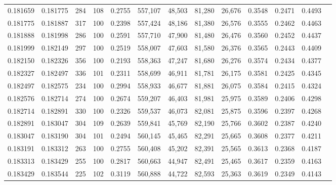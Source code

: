 \begin{tabular}{rrrrrrrrrrrrr}
0.181659 & 0.181775 &   284 & 108 &                                     0.2755 & 557,107 &  48,503 &  81,280 &  26,676 & 0.3548 & 0.2471 & 0.4493 \\
0.181775 & 0.181887 &   317 & 100 &                                     0.2398 & 557,424 &  48,186 &  81,380 &  26,576 & 0.3555 & 0.2462 & 0.4463 \\
0.181888 & 0.181998 &   286 & 100 &                                     0.2591 & 557,710 &  47,900 &  81,480 &  26,476 & 0.3560 & 0.2452 & 0.4437 \\
0.181999 & 0.182149 &   297 & 100 &                                     0.2519 & 558,007 &  47,603 &  81,580 &  26,376 & 0.3565 & 0.2443 & 0.4409 \\
0.182150 & 0.182326 &   356 & 100 &                                     0.2193 & 558,363 &  47,247 &  81,680 &  26,276 & 0.3574 & 0.2434 & 0.4377 \\
0.182327 & 0.182497 &   336 & 101 &                                     0.2311 & 558,699 &  46,911 &  81,781 &  26,175 & 0.3581 & 0.2425 & 0.4345 \\
0.182497 & 0.182575 &   234 & 100 &                                     0.2994 & 558,933 &  46,677 &  81,881 &  26,075 & 0.3584 & 0.2415 & 0.4324 \\
0.182576 & 0.182714 &   274 & 100 &                                     0.2674 & 559,207 &  46,403 &  81,981 &  25,975 & 0.3589 & 0.2406 & 0.4298 \\
0.182714 & 0.182891 &   330 & 100 &                                     0.2326 & 559,537 &  46,073 &  82,081 &  25,875 & 0.3596 & 0.2397 & 0.4268 \\
0.182891 & 0.183047 &   304 & 109 &                                     0.2639 & 559,841 &  45,769 &  82,190 &  25,766 & 0.3602 & 0.2387 & 0.4240 \\
0.183047 & 0.183190 &   304 & 101 &                                     0.2494 & 560,145 &  45,465 &  82,291 &  25,665 & 0.3608 & 0.2377 & 0.4211 \\
0.183191 & 0.183312 &   263 & 100 &                                     0.2755 & 560,408 &  45,202 &  82,391 &  25,565 & 0.3613 & 0.2368 & 0.4187 \\
0.183313 & 0.183429 &   255 & 100 &                                     0.2817 & 560,663 &  44,947 &  82,491 &  25,465 & 0.3617 & 0.2359 & 0.4163 \\
0.183429 & 0.183544 &   225 & 102 &                                     0.3119 & 560,888 &  44,722 &  82,593 &  25,363 & 0.3619 & 0.2349 & 0.4143 \\

\end{tabular}
